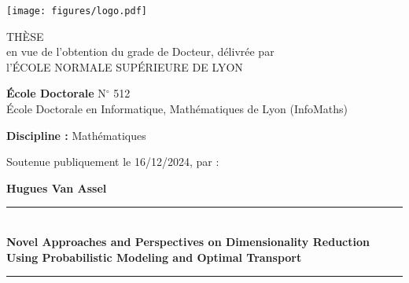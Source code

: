 
\begin{titlepage}
	
	\begin{center}
		\texttt{[image: figures/logo.pdf]}
		
		\vspace{30pt}
		
		{\Large {TH\`ESE \\ \vspace{1pt} en vue de l'obtention du grade de Docteur, délivrée par \\ \vspace{8pt} l'\'ECOLE NORMALE SUP\'ERIEURE DE LYON}}
		
		\vspace{30pt}
		
		{\large \textbf{\'Ecole Doctorale} N$^\circ $ 512}\\
		{\large{École Doctorale en Informatique, Mathématiques de Lyon (InfoMaths)}}
		
		\vspace{28pt}
		
		{\large\textbf{Discipline :} Mathématiques}
		
		\vspace{20pt}
		
		Soutenue publiquement le 16/12/2024, par :\\
		
		\vspace{12pt}
		
		{\Large\textbf{Hugues Van Assel}}\\
	\end{center}
	
	\vspace{12pt}
	
	\begin{center}
		\noindent\rule{16cm}{0.25pt}\\
		\vspace{10pt}
		{\LARGE \textbf{Novel Approaches and Perspectives on Dimensionality Reduction Using Probabilistic Modeling and Optimal Transport}} \\
		\noindent\rule{16cm}{0.25pt}\\
	\end{center}
	
    \vspace{18pt}
	

\end{titlepage}
